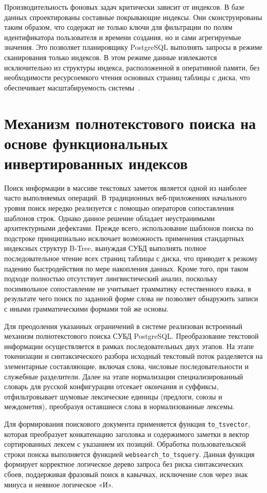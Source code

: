 \documentclass[a4paper,14pt]{extreport}
\begin{document}
Производительность фоновых задач критически зависит от индексов. В базе данных спроектированы составные покрывающие индексы. Они сконструированы таким образом, что содержат не только ключи для фильтрации по полям идентификатора пользователя и времени создания, но и сами агрегируемые значения. Это позволяет планировщику PostgreSQL выполнять запросы в режиме сканирования только индексов. В этом режиме данные извлекаются исключительно из структуры индекса, расположенной в оперативной памяти, без необходимости ресурсоемкого чтения основных страниц таблицы с диска, что обеспечивает масштабируемость системы~\cite{ref11}.

\section{Механизм полнотекстового поиска на основе функциональных инвертированных индексов}

Поиск информации в массиве текстовых заметок является одной из наиболее часто выполняемых операций. В традиционных веб-приложениях начального уровня поиск нередко реализуется с помощью операторов сопоставления шаблонов строк. Однако данное решение обладает неустранимыми архитектурными дефектами. Прежде всего, использование шаблонов поиска по подстроке принципиально исключает возможность применения стандартных индексных структур B-Tree, вынуждая СУБД выполнять полное последовательное чтение всех страниц таблицы с диска, что приводит к резкому падению быстродействия по мере накопления данных. Кроме того, при таком подходе полностью отсутствует лингвистический анализ, поскольку посимвольное сопоставление не учитывает грамматику естественного языка, в результате чего поиск по заданной форме слова не позволяет обнаружить записи с иными грамматическими формами той же основы.

Для преодоления указанных ограничений в системе реализован встроенный механизм полнотекстового поиска СУБД PostgreSQL. Преобразование текстовой информации осуществляется в рамках последовательных двух этапов. На этапе токенизации и синтаксического разбора исходный текстовый поток разделяется на элементарные составляющие, включая слова, числовые последовательности и служебные разделители. Далее на этапе нормализации специализированный словарь для русской конфигурации отсекает окончания и суффиксы, отфильтровывает шумовые лексические единицы (предлоги, союзы и междометия), преобразуя оставшиеся слова в нормализованные лексемы.

Для формирования поискового документа применяется функция \texttt{to\_tsvector}, которая преобразует конкатенацию заголовка и содержимого заметки в вектор сортированных лексем с указанием их позиций. Обработка пользовательской строки поиска выполняется функцией \texttt{websearch\_to\_tsquery}. Данная функция формирует корректное логическое дерево запроса без риска синтаксических сбоев, поддерживая фразовый поиск в кавычках, исключение слов через знак минуса и неявное логическое «И».
\end{document}
